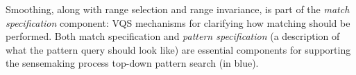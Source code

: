  Smoothing, along with range selection and range invariance, is part of the \emph{match specification} component: VQS mechanisms for clarifying how matching should be performed. Both match specification and \emph{pattern specification} (a description of what the pattern query should look like) are essential components for supporting the sensemaking process top-down pattern search (in blue).%


